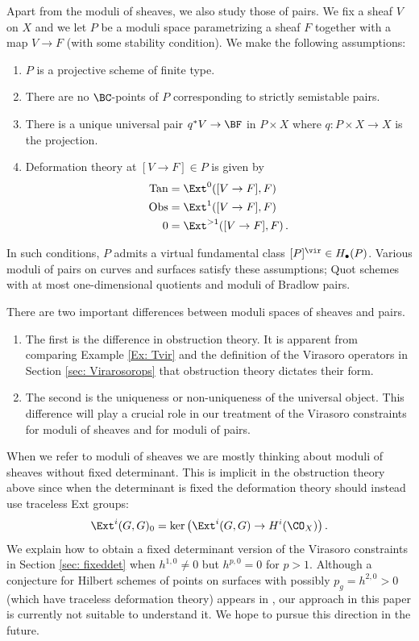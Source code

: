 Apart from the moduli of sheaves, we also study those of pairs. We fix a sheaf $V$ on $X$ and we let $P$ be a moduli space parametrizing a sheaf $F$ together with a map $V\to F$ (with some stability condition). We make the following assumptions:
\begin{enumerate}
\item $P$ is a projective scheme of finite type.
\item There are no $\BC$-points of $P$ corresponding to strictly semistable pairs.
\item There is a unique universal pair $q^*V\rightarrow\BF$ in $P\times X$ where $q\colon P\times X\to X$ is the projection.
\item Deformation theory at $[V\to F]\in P$ is given by
\begin{align*}
\textup{Tan}&=\Ext^0([V\to F],F)\\
\textup{Obs}&=\Ext^1([V\to F],F)\\
0&=\Ext^{>1}([V\to F],F)\,.
\end{align*}
\end{enumerate}
In such conditions, $P$ admits a virtual fundamental class $[P]^\vir\in H_\bullet(P)$. Various moduli of pairs on curves and surfaces satisfy these assumptions; Quot schemes with at most one-dimensional quotients and moduli of Bradlow pairs.

There are two important differences between moduli spaces of sheaves and pairs.
\begin{enumerate}
\item The first is the difference in obstruction theory. It is apparent from comparing Example \ref{Ex: Tvir} and the definition of the Virasoro operators in Section \ref{sec: Virarosorops} that obstruction theory dictates their form.
\item  The second is the uniqueness or non-uniqueness of the universal object. This difference will play a crucial role in our treatment of the Virasoro constraints for moduli of sheaves and for moduli of pairs.
\end{enumerate}



\begin{remark}
\notready\label{rem: tracelessobs}
When we refer to moduli of sheaves we are mostly thinking about moduli of sheaves without fixed determinant. This is implicit in the obstruction theory above since when the determinant is fixed the deformation theory should instead use traceless Ext groups:
\[\Ext^i(G,G)_0=\ker\left(\Ext^i(G,G)\to H^i(\CO_X)\right).\]
We explain how to obtain a fixed determinant version of the Virasoro constraints in Section \ref{sec: fixeddet} when $h^{1,0}\neq 0$ but $h^{p,0}=0$ for $p>1$. Although a conjecture for Hilbert schemes of points on surfaces with possibly $p_g=h^{2,0}>0$  (which have traceless deformation theory) appears in \cite{moreira}, our approach in this paper is currently not suitable to understand it. We hope to pursue this direction in the future.
\end{remark}


